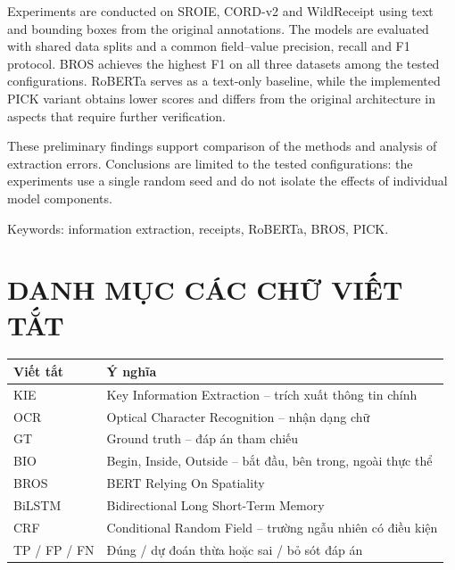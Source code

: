 Experiments are conducted on SROIE, CORD-v2 and WildReceipt using text and bounding boxes from the original annotations. The models are evaluated with shared data splits and a common field--value precision, recall and F1 protocol. BROS achieves the highest F1 on all three datasets among the tested configurations. RoBERTa serves as a text-only baseline, while the implemented PICK variant obtains lower scores and differs from the original architecture in aspects that require further verification.

These preliminary findings support comparison of the methods and analysis of extraction errors. Conclusions are limited to the tested configurations: the experiments use a single random seed and do not isolate the effects of individual model components.

Keywords: information extraction, receipts, RoBERTa, BROS, PICK.
\clearpage
\begingroup
\renewcommand{\baselinestretch}{1.05}\normalsize
\tableofcontents
\endgroup
\clearpage
{}\listoffigures
\clearpage
{}\listoftables
\chapter*{DANH MỤC CÁC CHỮ VIẾT TẮT}
\begin{table}[H]
\centering
\renewcommand{\arraystretch}{1.25}
\fontsize{12}{14}\selectfont
\setlength{\tabcolsep}{4pt}
\begin{tabular}{L{2.4cm}L{12.0cm}}
\toprule
\textbf{Viết tắt} & \textbf{Ý nghĩa} \\
\midrule
KIE & Key Information Extraction -- trích xuất thông tin chính \\
OCR & Optical Character Recognition -- nhận dạng chữ \\
GT & Ground truth -- đáp án tham chiếu \\
BIO & Begin, Inside, Outside -- bắt đầu, bên trong, ngoài thực thể \\
BROS & BERT Relying On Spatiality \\
BiLSTM & Bidirectional Long Short-Term Memory \\
CRF & Conditional Random Field -- trường ngẫu nhiên có điều kiện \\
TP / FP / FN & Đúng / dự đoán thừa hoặc sai / bỏ sót đáp án \\
\bottomrule
\end{tabular}
\end{table}
\clearpage
{}
